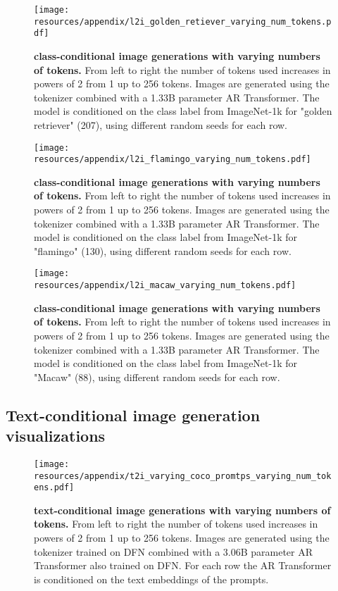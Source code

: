 \begin{figure}[ht!]
\centering
\texttt{[image: resources/appendix/l2i\_golden\_retiever\_varying\_num\_tokens.pdf]}
\caption{
\textbf{\ours class-conditional image generations with varying numbers of tokens.} From left to right the number of tokens used increases in powers of 2 from 1 up to 256 tokens. Images are generated using the \oursxlarge tokenizer combined with a 1.33B parameter AR Transformer. The model is conditioned on the class label from ImageNet-1k for "golden retriever" (207), using different random seeds for each row.
}
\label{fig:l2i_golden_retiever_varying_num_tokens}
\end{figure}

\begin{figure}[ht!]
\centering
\texttt{[image: resources/appendix/l2i\_flamingo\_varying\_num\_tokens.pdf]}
\caption{
\textbf{\ours class-conditional image generations with varying numbers of tokens.} From left to right the number of tokens used increases in powers of 2 from 1 up to 256 tokens. Images are generated using the \oursxlarge tokenizer combined with a 1.33B parameter AR Transformer. The model is conditioned on the class label from ImageNet-1k for "flamingo" (130), using different random seeds for each row.
}
\label{fig:l2i_flamingo_varying_num_tokens}
\end{figure}

\begin{figure}[ht!]
\centering
\texttt{[image: resources/appendix/l2i\_macaw\_varying\_num\_tokens.pdf]}
\caption{
\textbf{\ours class-conditional image generations with varying numbers of tokens.} From left to right the number of tokens used increases in powers of 2 from 1 up to 256 tokens. Images are generated using the \oursxlarge tokenizer combined with a 1.33B parameter AR Transformer. The model is conditioned on the class label from ImageNet-1k for "Macaw" (88), using different random seeds for each row.
}
\label{fig:l2i_macaw_varying_num_tokens}
\end{figure}


\clearpage
\subsection{Text-conditional image generation visualizations}
\label{sec:app_t2i_viz}

\begin{figure}[ht!]
\centering
\texttt{[image: resources/appendix/t2i\_varying\_coco\_promtps\_varying\_num\_tokens.pdf]}
\caption{
\textbf{\ours text-conditional image generations with varying numbers of tokens.} From left to right the number of tokens used increases in powers of 2 from 1 up to 256 tokens. Images are generated using the \oursxlarge tokenizer trained on DFN combined with a 3.06B parameter AR Transformer also trained on DFN. For each row the AR Transformer is conditioned on the text embeddings of the prompts.
}
\label{fig:t2i_varying_coco_promtps_varying_num_tokens}
\end{figure}

